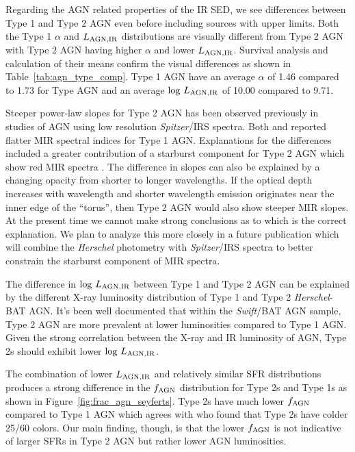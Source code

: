 \documentclass[fleqn, usenatbib]{mnras}
\newcommand{\herschel}{\emph{Herschel}}
\newcommand{\swift}{\textit{Swift}}
\begin{document}
Regarding the AGN related properties of the IR SED, we see differences between Type 1 and Type 2 AGN even before including sources with upper limits. Both the Type 1 $\alpha$ and $L_{\rm AGN,IR}$ distributions are visually different from Type 2 AGN with Type 2 AGN having higher $\alpha$ and lower $L_{\rm AGN,IR}$. Survival analysis and calculation of their means confirm the visual differences as shown in Table~\ref{tab:agn_type_comp}. Type 1 AGN have an average $\alpha$ of 1.46 compared to 1.73 for Type AGN and an average $\log\,L_{\rm AGN,IR}$ of 10.00 compared to 9.71. 

Steeper power-law slopes for Type 2 AGN has been observed previously in studies of AGN using low resolution \textit{Spitzer}/IRS spectra. Both \citet{Buchanan:2006cq} and \citet{Wu:2009pt} reported flatter MIR spectral indices for Type 1 AGN. Explanations for the differences included a greater contribution of a starburst component for Type 2 AGN which show red MIR spectra \citet{Brandl:2006kx}. The difference in slopes can also be explained by a changing opacity from shorter to longer wavelengths. If the optical depth increases with wavelength and shorter wavelength emission originates near the inner edge of the ``torus'', then Type 2 AGN would also show steeper MIR slopes. At the present time we cannot make strong conclusions as to which is the correct explanation. We plan to analyze this more closely in a future publication which will combine the \herschel{} photometry with \textit{Spitzer}/IRS spectra to better constrain the starburst component of MIR spectra. 

The difference in $\log\,L_{\rm AGN,IR}$ between Type 1 and Type 2 AGN can be explained by the different X-ray luminosity distribution of Type 1 and Type 2 \herschel-BAT AGN. It's been well documented  \citep[e.g.][]{Burlon:2011pi, Melendez:2014yu} that within the \swift/BAT AGN sample, Type 2 AGN are more prevalent at lower luminosities compared to Type 1 AGN. Given the strong correlation between the X-ray and IR luminosity of AGN, Type 2s should exhibit lower $\log\,L_{\rm AGN,IR}$.

The combination of lower $L_{\rm AGN,IR}$ and relatively similar SFR distributions produces a strong difference in the $f_{\rm AGN}$ distribution for Type 2s and Type 1s as shown in Figure~\ref{fig:frac_agn_seyferts}. Type 2s have much lower $f_{\rm AGN}$ compared to Type 1 AGN which agrees with \citet{Melendez:2008pd} who found that Type 2s have colder 25/60 \micron{} colors. Our main finding, though, is that the lower $f_{\rm AGN}$ is not indicative of larger SFRs in Type 2 AGN but rather lower AGN luminosities. 
\end{document}
